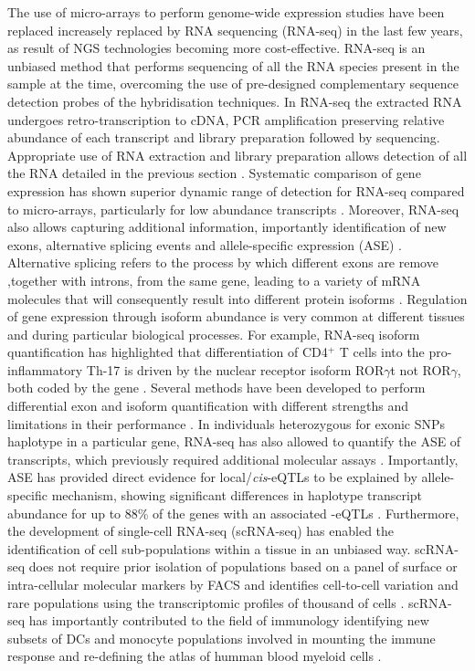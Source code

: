 The use of micro-arrays to perform genome-wide expression studies have been replaced increasely replaced by RNA sequencing (RNA-seq) in the last few years, as result of NGS technologies becoming more cost-effective. RNA-seq is an unbiased method that performs sequencing of all the RNA species present in the sample at the time, overcoming the use of pre-designed complementary sequence detection probes of the hybridisation techniques. In RNA-seq the extracted RNA undergoes retro-transcription to cDNA, PCR amplification preserving relative abundance of each transcript and library preparation followed by sequencing. Appropriate use of RNA extraction and library preparation allows detection of all the RNA detailed in the previous section \parencite{}. Systematic comparison of gene expression has shown superior dynamic range of detection for RNA-seq compared to micro-arrays, particularly for low abundance transcripts \parencite{Zhao2014}. Moreover, RNA-seq also allows capturing additional information, importantly identification of new exons, alternative splicing events and allele-specific expression (ASE) . Alternative splicing refers to the process by which different exons are remove ,together with introns, from the same gene, leading to a variety of mRNA molecules that will consequently result into different protein isoforms \parencite{Pan2008}. Regulation of gene expression through isoform abundance is very common at different tissues and during particular biological processes. For example, RNA-seq isoform quantification has highlighted that differentiation of CD4$^+$ T cells into the pro-inflammatory Th-17 is driven by the nuclear receptor isoform ROR$\gamma$t not ROR$\gamma$, both coded by the  gene \parencite{Zhao2014}. Several methods have been developed to perform differential exon and isoform quantification with different strengths and limitations in their performance \parencite{Steijger2013,Ding2017}. In individuals heterozygous for exonic SNPs haplotype in a particular gene, RNA-seq has also allowed to quantify the ASE of transcripts, which previously required additional molecular assays \parencite{Yan2002}. Importantly, ASE has provided direct evidence for local/\textit{cis}-eQTLs to be explained by allele-specific mechanism, showing significant differences in haplotype transcript abundance for up to 88\% of the genes with an associated -eQTLs \parencite{Pickrell2010}. Furthermore, the development of single-cell RNA-seq (scRNA-seq) has enabled the identification of cell sub-populations within a tissue in an unbiased way. scRNA-seq does not require prior isolation of populations based on a panel of surface or intra-cellular molecular markers by FACS and identifies cell-to-cell variation and rare populations using the transcriptomic profiles of thousand of cells \parencite{Tang2009}. scRNA-seq has importantly contributed to the field of immunology identifying new subsets of DCs and monocyte populations involved in mounting the immune response and re-defining the atlas of humman blood myeloid cells \parencite{Jaitin2014, Villani2017}. 

